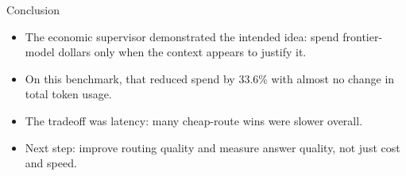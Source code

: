 \documentclass[aspectratio=169]{beamer}
\begin{document}
\begin{frame}{Conclusion}
  \begin{itemize}
    \item The economic supervisor demonstrated the intended idea: spend frontier-model dollars only when the context appears to justify it.
    \item On this benchmark, that reduced spend by 33.6\% with almost no change in total token usage.
    \item The tradeoff was latency: many cheap-route wins were slower overall.
    \item Next step: improve routing quality and measure answer quality, not just cost and speed.
  \end{itemize}
\end{frame}
\end{document}
